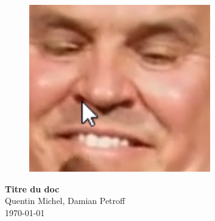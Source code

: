 \documentclass[a4paper,10pt,openany,oneside]{report}
\begin{document}
\begin{figure}
\centering
\vspace*{1cm}
\includegraphics[width=0.7\textwidth]{img/example.png}
\end{figure}
\vspace*{3cm}
\begin{center}
\textbf{\Huge{Titre du doc}} \\[1cm]
{\Large Quentin Michel, Damian Petroff} \\[5cm]
\today
\end{center}
\end{document}
